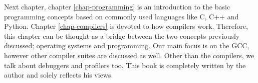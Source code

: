Next chapter, chapter \ref{chap-programming} is an introduction to the basic programming concepts
based on commonly used languages like C, C++ and Python. 
\newline \newline 
Chapter \ref{chap-compilers} is devoted to how compilers work. Therefore, this chapter can be thought
as a bridge between the two concepts previously discussed; operating systems and programming. Our main
focus is on the GCC, however other compiler suites are discussed as well. Other than the compilers, 
we talk about debuggers and profilers too.
\newline \newline 
This book is completely written by the author and solely reflects his views.
